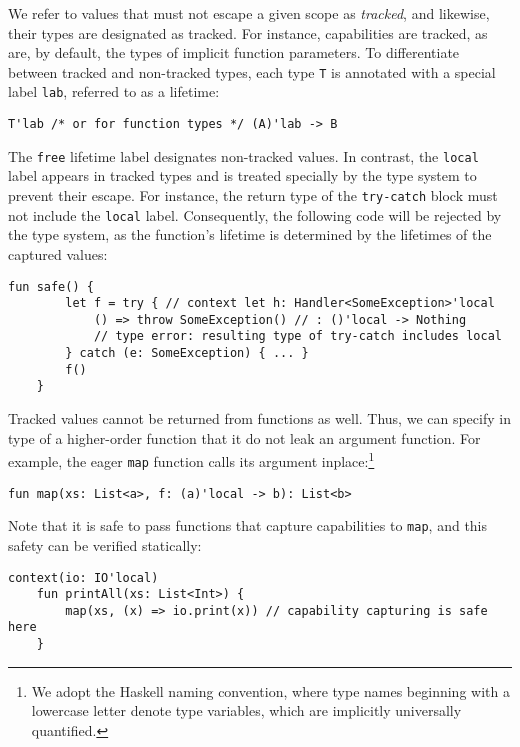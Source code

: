 \documentclass[acmsmall,review,screen]{acmart}
\begin{document}
We refer to values that must not escape a given scope as \textit{tracked}, and likewise, their types are designated as tracked.
For instance, capabilities are tracked, as are, by default, the types of implicit function parameters.
To differentiate between tracked and non-tracked types, each type \lstinline[language=colang]|T| is annotated with a special label \lstinline[language=colang]|lab|, referred to as a lifetime:
\begin{lstlisting}[language=colang]
    T'lab /* or for function types */ (A)'lab -> B
\end{lstlisting}

The \lstinline[language=colang]|free| lifetime label designates non-tracked values.
In contrast, the \lstinline[language=colang]|local| label appears in tracked types and is treated specially by the type system to prevent their escape.
For instance, the return type of the \lstinline[language=colang]|try-catch| block must not include the \lstinline[language=colang]|local| label.
Consequently, the following code will be rejected by the type system, as the function’s lifetime is determined by the lifetimes of the captured values:
\begin{lstlisting}[language=colang]
    fun safe() {
        let f = try { // context let h: Handler<SomeException>'local
            () => throw SomeException() // : ()'local -> Nothing
            // type error: resulting type of try-catch includes local
        } catch (e: SomeException) { ... }
        f()
    }
\end{lstlisting}

Tracked values cannot be returned from functions as well.
Thus, we can specify in type of a higher-order function that it do not leak an argument function.
For example, the eager \lstinline[language=colang]|map| function calls its argument inplace:\footnote{We adopt the Haskell naming convention, where type names beginning with a lowercase letter denote type variables, which are implicitly universally quantified.}
\begin{lstlisting}[language=colang]
    fun map(xs: List<a>, f: (a)'local -> b): List<b>
\end{lstlisting}

Note that it is safe to pass functions that capture capabilities to \lstinline[language=colang]|map|, and this safety can be verified statically:
\begin{lstlisting}[language=colang]
    context(io: IO'local)
    fun printAll(xs: List<Int>) {
        map(xs, (x) => io.print(x)) // capability capturing is safe here
    }
\end{lstlisting}
\end{document}
